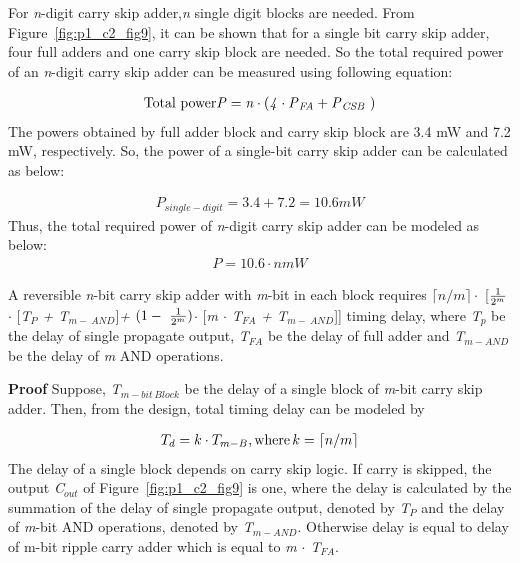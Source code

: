 For {\it n}-digit carry skip adder,{\it n} single digit blocks are needed. From Figure~\ref{fig:p1_c2_fig9}, it can be shown that for a single bit carry skip adder, four full adders and one carry skip block are needed. So the total required power of an {\it n}-digit carry skip adder can be measured using following equation:

\begin{align*}
\textnormal{Total power} {\it P = n \cdot (4 \cdot P{}_{FA}+ P{}_{CSB\ })}
\end{align*}
\textnormal{
	The powers obtained by full adder block and carry skip block are { 3.4 mW} and {7.2 mW}, respectively. So, the power of a single-bit carry skip adder can be calculated as below:}

\begin{align*}
P{}_{single-digit} = 3.4 +7.2  = 10.6 mW
\end{align*}
\textnormal{
	Thus, the total required power of {\it n}-digit carry skip adder can be modeled as below:}
\begin{align*}
P = 10.6 \cdot n mW
\end{align*}

\begin{property}\textnormal{
		A reversible {\it n}-bit carry skip adder with {\it m}-bit in each block requires $\lceil{n/m}\rceil{\cdot}$ [${{1}\over {2^m}}${\it  $\cdot$ }[{\it T${}_{P}$ +  T${}_{m-\ AND}$}]{\it  + }$(1-\ {{1}\over {2^m}})${\it $\cdot$ }[{\it m $\cdot$ T${}_{FA}$ + T${}_{m-\ AND}$}]] timing delay, where {\it T${}_{p}$} be the delay of single propagate output, {\it T${}_{FA}$} be the delay of full adder and {\it T${}_{m-AND}$} be the delay of {\it m} AND operations.}
\end{property}

\noindent\textbf{Proof}\textnormal{
	Suppose, {\it T${}_{m-bit\ Block}$} be the delay of a single block of {\it m}-bit carry skip adder. Then, from the design, total timing delay can be modeled by}

\begin{align*}
T_{d} = k \cdot T_{m-B}, \textnormal{where} \, k=\lceil{n/m}\rceil
\end{align*}
\textnormal{	
	The delay of a single block depends on carry skip logic. If carry is skipped, the output {\it C${}_{out}$} of Figure~\ref{fig:p1_c2_fig9} is one, where the delay is calculated by the summation of the delay of single propagate output, denoted by {\it T${}_{P}$} and the delay of {\it m}-bit AND operations, denoted by {\it T${}_{m-AND}$}. Otherwise delay is equal to delay of m-bit ripple carry adder which is equal to {\it m $\cdot$ T${}_{FA}$}.}

